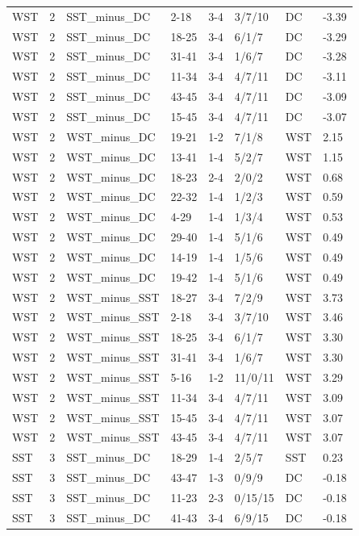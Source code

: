 \begin{table}[!h]
\begin{tabular}[t]{lrllllll}
WST & 2 & SST_minus_DC & 2-18 & 3-4 & 3/7/10 & DC & -3.39\\
\addlinespace
WST & 2 & SST_minus_DC & 18-25 & 3-4 & 6/1/7 & DC & -3.29\\
WST & 2 & SST_minus_DC & 31-41 & 3-4 & 1/6/7 & DC & -3.28\\
WST & 2 & SST_minus_DC & 11-34 & 3-4 & 4/7/11 & DC & -3.11\\
WST & 2 & SST_minus_DC & 43-45 & 3-4 & 4/7/11 & DC & -3.09\\
WST & 2 & SST_minus_DC & 15-45 & 3-4 & 4/7/11 & DC & -3.07\\
\addlinespace
WST & 2 & WST_minus_DC & 19-21 & 1-2 & 7/1/8 & WST & 2.15\\
WST & 2 & WST_minus_DC & 13-41 & 1-4 & 5/2/7 & WST & 1.15\\
WST & 2 & WST_minus_DC & 18-23 & 2-4 & 2/0/2 & WST & 0.68\\
WST & 2 & WST_minus_DC & 22-32 & 1-4 & 1/2/3 & WST & 0.59\\
WST & 2 & WST_minus_DC & 4-29 & 1-4 & 1/3/4 & WST & 0.53\\
\addlinespace
WST & 2 & WST_minus_DC & 29-40 & 1-4 & 5/1/6 & WST & 0.49\\
WST & 2 & WST_minus_DC & 14-19 & 1-4 & 1/5/6 & WST & 0.49\\
WST & 2 & WST_minus_DC & 19-42 & 1-4 & 5/1/6 & WST & 0.49\\
WST & 2 & WST_minus_SST & 18-27 & 3-4 & 7/2/9 & WST & 3.73\\
WST & 2 & WST_minus_SST & 2-18 & 3-4 & 3/7/10 & WST & 3.46\\
\addlinespace
WST & 2 & WST_minus_SST & 18-25 & 3-4 & 6/1/7 & WST & 3.30\\
WST & 2 & WST_minus_SST & 31-41 & 3-4 & 1/6/7 & WST & 3.30\\
WST & 2 & WST_minus_SST & 5-16 & 1-2 & 11/0/11 & WST & 3.29\\
WST & 2 & WST_minus_SST & 11-34 & 3-4 & 4/7/11 & WST & 3.09\\
WST & 2 & WST_minus_SST & 15-45 & 3-4 & 4/7/11 & WST & 3.07\\
\addlinespace
WST & 2 & WST_minus_SST & 43-45 & 3-4 & 4/7/11 & WST & 3.07\\
SST & 3 & SST_minus_DC & 18-29 & 1-4 & 2/5/7 & SST & 0.23\\
SST & 3 & SST_minus_DC & 43-47 & 1-3 & 0/9/9 & DC & -0.18\\
SST & 3 & SST_minus_DC & 11-23 & 2-3 & 0/15/15 & DC & -0.18\\
SST & 3 & SST_minus_DC & 41-43 & 3-4 & 6/9/15 & DC & -0.18\\

\end{tabular}
\end{table}
